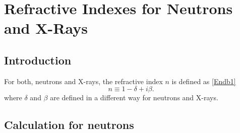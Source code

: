 

\chapter{Refractive Indexes for Neutrons and X-Rays}\label{SRefrIndx}

\section{Introduction}
\par
For both, neutrons and X-rays, the refractive index $n$ is defined as \cref{Endb1}
\begin{equation}
  n\equiv 1-\delta +i \beta.
\end{equation}
where $\delta$ and $\beta$ are defined in a different way for neutrons and X-rays.
\par
\section{Calculation for neutrons}

